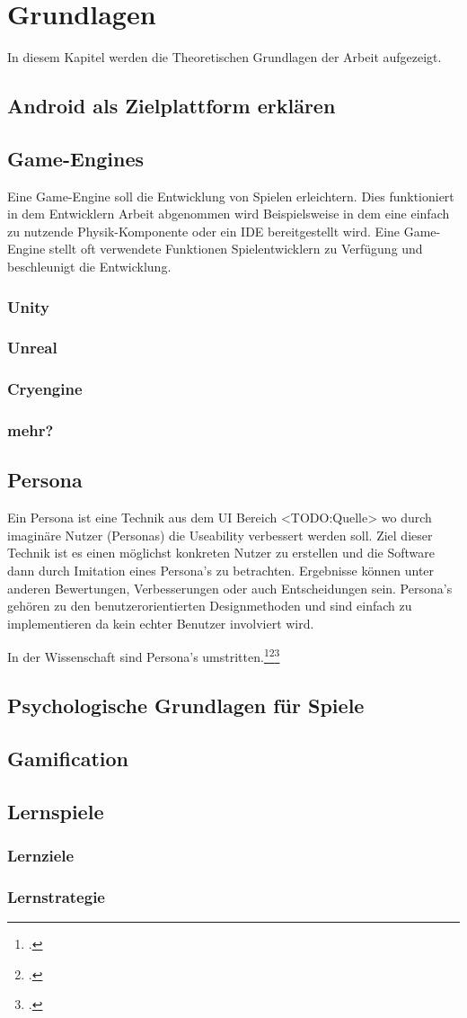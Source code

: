 \section{Grundlagen}
	In diesem Kapitel werden die Theoretischen Grundlagen der Arbeit aufgezeigt.
\subsection{Android als Zielplattform erklären}
\subsection{Game-Engines}
	Eine Game-Engine soll die Entwicklung von Spielen erleichtern. Dies funktioniert in dem Entwicklern Arbeit abgenommen wird Beispielsweise in dem eine einfach zu nutzende Physik-Komponente oder ein \gls{IDE} bereitgestellt wird. Eine Game-Engine stellt oft verwendete Funktionen Spielentwicklern zu Verfügung und beschleunigt die Entwicklung.
	\subsubsection*{Unity}
	\subsubsection*{Unreal}
	\subsubsection*{Cryengine}
	\subsubsection*{mehr?}
\subsection{Persona}\label{ssec:persona}
	Ein Persona ist eine Technik aus dem UI Bereich <TODO:Quelle> wo durch imaginäre Nutzer (Personas) die Useability verbessert werden soll. Ziel dieser Technik ist es einen möglichst konkreten Nutzer zu erstellen und die Software dann durch Imitation eines Persona's zu betrachten. Ergebnisse können unter anderen Bewertungen, Verbesserungen oder auch Entscheidungen sein.
	Persona's gehören zu den benutzerorientierten Designmethoden und sind einfach zu implementieren da kein echter Benutzer involviert wird.

	In der Wissenschaft sind Persona's umstritten.\footcite{persona-crit}\footcite{persona-crit2}\footcite{persona-crit3}
\subsection{Psychologische Grundlagen für Spiele}
\subsection{Gamification}
\subsection{Lernspiele}
	\subsubsection{Lernziele}
	\subsubsection{Lernstrategie}
